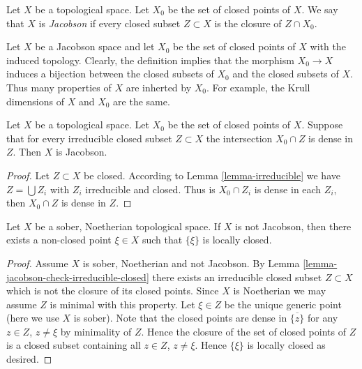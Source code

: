\begin{definition}
\label{definition-space-jacobson}
Let $X$ be a topological space.
Let $X_0$ be the set of closed points of $X$.
We say that $X$ is {\it Jacobson} if every
closed subset $Z \subset X$ is the closure
of $Z \cap X_0$.
\end{definition}

\noindent
Let $X$ be a Jacobson space and let $X_0$ be the set
of closed points of $X$ with the induced topology.
Clearly, the definition implies that the morphism
$X_0 \to X$ induces a bijection between the closed
subsets of $X_0$ and the closed subsets of $X$.
Thus many properties of $X$ are inherted by $X_0$.
For example, the Krull dimensions of $X$ and $X_0$
are the same.

\begin{lemma}
\label{lemma-jacobson-check-irreducible-closed}
Let $X$ be a topological space. Let $X_0$ be the set
of closed points of $X$.
Suppose that for every irreducible closed subset $Z \subset X$
the intersection $X_0 \cap Z$ is dense in $Z$.
Then $X$ is Jacobson.
\end{lemma}

\begin{proof}
Let $Z \subset X$ be closed. According to Lemma \ref{lemma-irreducible}
we have $Z = \bigcup Z_i$ with $Z_i$ irreducible and closed.
Thus is $X_0 \cap Z_i$ is dense in each $Z_i$, then $X_0 \cap Z$
is dense in $Z$.
\end{proof}

\begin{lemma}
\label{lemma-non-jacobson-Noetherian-characterize}
Let $X$ be a sober, Noetherian topological space.
If $X$ is not Jacobson, then there exists a non-closed point
$\xi \in X$ such that $\{\xi\}$ is locally closed.
\end{lemma}

\begin{proof}
Assume $X$ is sober, Noetherian and not Jacobson.
By Lemma \ref{lemma-jacobson-check-irreducible-closed} there exists
an irreducible closed subset $Z \subset X$ which is not the closure
of its closed points. Since $X$ is Noetherian we may assume $Z$ is
minimal with this property. Let $\xi \in Z$ be the unique generic point
(here we use $X$ is sober). Note that the closed points are dense in
$\overline{\{z\}}$ for any $z \in Z$, $z \not = \xi$ by minimality
of $Z$. Hence the closure of the set of closed points of $Z$ is
a closed subset containing all $z \in Z$, $z \not = \xi$. Hence
$\{\xi\}$ is locally closed as desired.
\end{proof}


